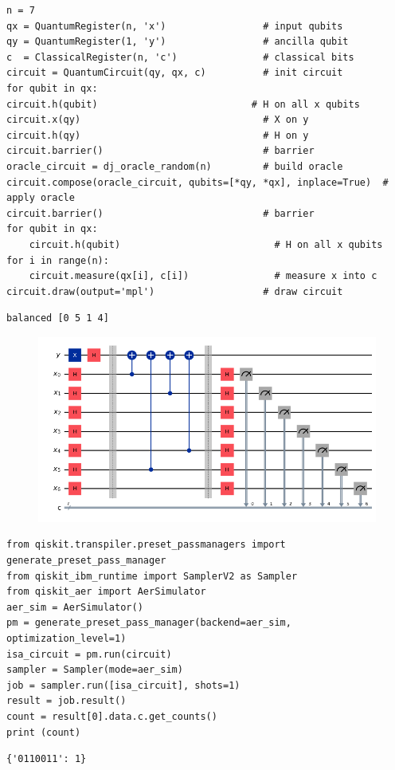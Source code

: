 \begin{lstlisting}[style=python]
n = 7
qx = QuantumRegister(n, 'x')                 # input qubits
qy = QuantumRegister(1, 'y')                 # ancilla qubit
c  = ClassicalRegister(n, 'c')               # classical bits
circuit = QuantumCircuit(qy, qx, c)          # init circuit
for qubit in qx:
circuit.h(qubit)                           # H on all x qubits
circuit.x(qy)                                # X on y
circuit.h(qy)                                # H on y
circuit.barrier()                            # barrier
oracle_circuit = dj_oracle_random(n)         # build oracle
circuit.compose(oracle_circuit, qubits=[*qy, *qx], inplace=True)  # apply oracle
circuit.barrier()                            # barrier
for qubit in qx:
	circuit.h(qubit)                           # H on all x qubits
for i in range(n):
	circuit.measure(qx[i], c[i])               # measure x into c
circuit.draw(output='mpl')                   # draw circuit
\end{lstlisting}
\begin{lstlisting}
balanced [0 5 1 4]
\end{lstlisting}

\begin{figure}[h!]\centering
	\includegraphics[scale=.5]{images/lab04_2}
\end{figure}

\begin{lstlisting}[style=python]
from qiskit.transpiler.preset_passmanagers import generate_preset_pass_manager
from qiskit_ibm_runtime import SamplerV2 as Sampler
from qiskit_aer import AerSimulator
aer_sim = AerSimulator()
pm = generate_preset_pass_manager(backend=aer_sim, optimization_level=1)
isa_circuit = pm.run(circuit)
sampler = Sampler(mode=aer_sim)
job = sampler.run([isa_circuit], shots=1)
result = job.result()
count = result[0].data.c.get_counts()
print (count)
\end{lstlisting}
\begin{lstlisting}
{'0110011': 1}
\end{lstlisting}

